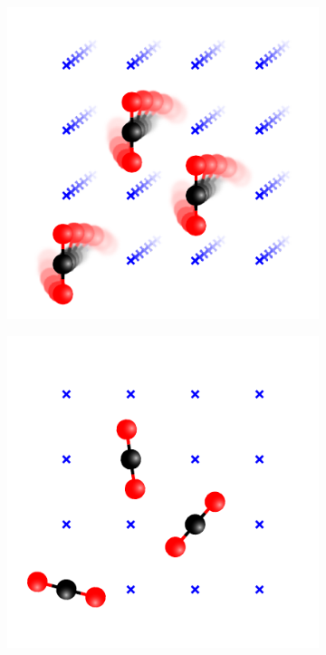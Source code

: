 \documentclass[main.tex]{subfiles}
\begin{document}
\begin{figure}
	\centering
	\hfill\begin{subfigure}{0.33\linewidth}
		\includegraphics[width=1.05\linewidth]{figures/gcmc/gridMC_optionA.pdf}
	\end{subfigure}\hfill%
	\begin{subfigure}{0.33\linewidth}
		\includegraphics[width=1.05\linewidth]{figures/gcmc/gridMC_optionB.pdf}

\end{subfigure}
\end{figure}
\end{document}
